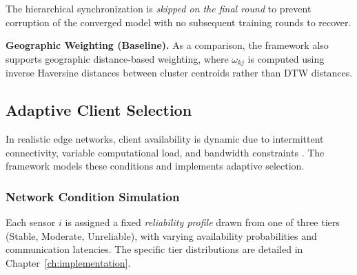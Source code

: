 The hierarchical synchronization is \textit{skipped on the final round} to prevent corruption of the converged model with no subsequent training rounds to recover.

\textbf{Geographic Weighting (Baseline).} As a comparison, the framework also supports geographic distance-based weighting, where $\omega_{kj}$ is computed using inverse Haversine distances between cluster centroids rather than DTW distances.

\subsection{Adaptive Client Selection}
\label{sec:client_selection}
In realistic edge networks, client availability is dynamic due to intermittent connectivity, variable computational load, and bandwidth constraints \cite{nishio2019, lai2021oort}. The framework models these conditions and implements adaptive selection.

\subsubsection{Network Condition Simulation}

Each sensor $i$ is assigned a fixed \textit{reliability profile} drawn from one of three tiers (Stable, Moderate, Unreliable), with varying availability probabilities and communication latencies. The specific tier distributions are detailed in Chapter~\ref{ch:implementation}.

